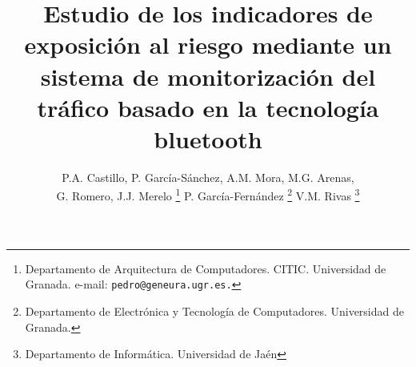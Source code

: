 \documentclass[twocolumn,twoside]{Jornadas}
\begin{document}
\title{Estudio de los indicadores de exposición al riesgo mediante un sistema de monitorización del tráfico basado en la tecnología bluetooth}  

\author{%
	P.A. Castillo, P. García-Sánchez, A.M. Mora, M.G. Arenas, \\ G. Romero, J.J. Merelo
     \thanks{Departamento de Arquitectura de Computadores. CITIC. Universidad de Granada.
	e-mail: {\tt pedro@geneura.ugr.es.}}
	P. García-Fernández
     \thanks{Departamento de Electrónica y Tecnología de Computadores. Universidad de Granada.}
	V.M. Rivas
     \thanks{Departamento de Informática. Universidad de Jaén}
}


\maketitle
\markboth{}{}
\pagestyle{empty} 
\thispagestyle{empty} %
\end{document}
